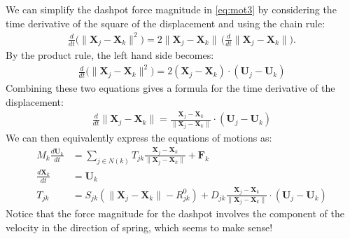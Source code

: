 \documentclass[10pt]{article}
\newcommand{\bs}[1]{{\boldsymbol #1}}
\begin{document}
We can simplify the dashpot force magnitude in \eqref{eq:mot3} by considering the time derivative of the square of the displacement and using the chain rule:
\begin{align*}
\frac{d}{dt} \Big(\|{\bs X}_j - {\bs X}_k\|^2\Big) = 2 \|{\bs X}_j - {\bs X}_k\| \, \Big( \frac{d}{dt} \|{\bs X}_j - {\bs X}_k \| \Big).
\end{align*}  
By the product rule, the left hand side becomes:
\begin{align*}
\frac{d}{dt} \Big(\|{\bs X}_j - {\bs X}_k\|^2\Big) = 2({\bs X}_j - {\bs X}_k) \cdot ({\bs U}_j - {\bs U}_k)
\end{align*}
Combining these two equations gives a formula for the time derivative of the displacement:
\begin{align*}
\frac{d}{dt} \|{\bs X}_j - {\bs X}_k \| = \frac{{\bs X}_j - {\bs X}_k}{\|{\bs X}_j - {\bs X}_k\|} \cdot ({\bs U}_j - {\bs U}_k)
\end{align*}
We can then equivalently express the equations of motions as: 
\begin{align}
\label{eq:mot4}
M_k \frac{d {\bs U}_k}{dt} &= \sum_{j \in N(k)} T_{jk} \frac{{\bs X}_j - {\bs X}_k}{\| {\bs X}_j - {\bs X}_k \|} + {\bs F}_k\\
\label{eq:mot5}
\frac{d {\bs X}_k}{dt} &= {\bs U}_k \\
\label{eq:mot6}
T_{jk} &= S_{jk} \left( \|{\bs X}_j - {\bs X}_k\| - R^0_{jk} \right) + D_{jk} \frac{{\bs X}_j - {\bs X}_k}{\|{\bs X}_j - {\bs X}_k\|} \cdot ({\bs U}_j - {\bs U}_k)
\end{align}
Notice that the force magnitude for the dashpot involves the component of the velocity in the direction of spring, which seems to make sense!
\end{document}
